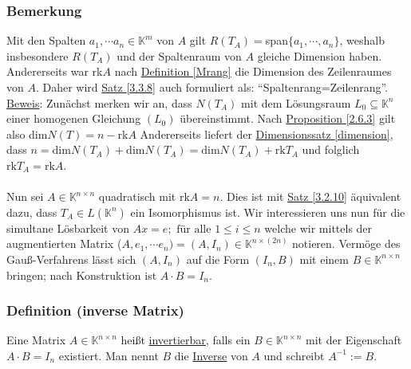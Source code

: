 \subsubsection{Bemerkung}
\label{3.3.9}
Mit den Spalten $a_1,\cdots a_n\in \mathbb{K}^m$ von $A$ gilt $R(T_A)=$span$\{a_1,\cdots ,a_n\}$, weshalb insbesondere $R(T_A)$ und der Spaltenraum von $A$ gleiche Dimension haben.  Andererseits war rk$A$ nach \hyperref[Mrang]{Definition \ref*{Mrang}} die Dimension des Zeilenraumes von $A$.  Daher wird \hyperref[3.3.8]{Satz \ref*{3.3.8}} auch formuliert als: "`Spaltenrang=Zeilenrang"'.\\
\underline{Beweis}: Zunächst merken wir an, dass $N(T_A)$ mit dem Lösungsraum $L_0\subseteq \mathbb{K}^n$ einer homogenen Gleichung $(L_0)$ übereinstimmt.  Nach \hyperref[2.6.3]{Proposition \ref*{2.6.3}} gilt also dim$N(T)=n-$rk$A$ Andererseits liefert der \hyperref[dimension]{Dimensionssatz \ref*{dimension}}, dass $n=\mathrm{dim}N(T_A)+\mathrm{dim}N(T_A)=\mathrm{dim}N(T_A)+\mathrm{rk}T_A$ und folglich $\mathrm{rk}T_A=\mathrm{rk}A$.\\\\
Nun sei $A\in\mathbb{K}^{n\times n}$ quadratisch mit rk$A=n$.  Dies ist mit \hyperref[3.2.10]{Satz \ref*{3.2.10}} äquivalent dazu, dass $T_A\in L(\mathbb{K}^n)$ ein Isomorphismus ist.  Wir interessieren uns nun für die simultane Lösbarkeit von
$Ax=e;\text{ für alle } 1\leq i\leq n$ welche wir mittels der augmentierten Matrix ($A,e_1,\cdots e_n)=(A,I_n)\in \mathbb{K}^{n\times (2n)}$ notieren.  Vermöge des Gauß-Verfahrens lässt sich $(A,I_n)$ auf die Form $(I_n,B)$ mit einem $B\in\mathbb{K}^{n\times n}$ bringen; nach Konstruktion ist $A\cdot B=I_n$.
\subsubsection{Definition (inverse Matrix)}
Eine Matrix $A\in\mathbb{K}^{n\times n}$ heißt \underline{invertierbar}, falls ein $B\in\mathbb{K}^{n\times n}$ mit der Eigenschaft $A\cdot B=I_n$ existiert.  Man nennt $B$ die \underline{Inverse} von $A$ und schreibt $A^{-1}:=B$.
